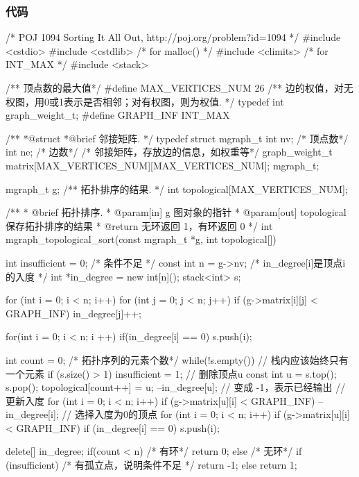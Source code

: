 \subsubsection{代码}
\begin{Codex}[label=poj_1094.c]
/* POJ 1094 Sorting It All Out, http://poj.org/problem?id=1094 */
#include <cstdio>
#include <cstdlib>  /* for malloc() */
#include <climits>  /* for INT_MAX */
#include <stack>

/** 顶点数的最大值*/
#define MAX_VERTICES_NUM 26
/** 边的权值，对无权图，用0或1表示是否相邻；对有权图，则为权值. */
typedef int graph_weight_t;
#define GRAPH_INF INT_MAX

/**
 *@struct
 *@brief 邻接矩阵.
 */
typedef struct mgraph_t {
    int nv; /* 顶点数*/
    int ne; /* 边数*/
    /* 邻接矩阵，存放边的信息，如权重等*/
    graph_weight_t matrix[MAX_VERTICES_NUM][MAX_VERTICES_NUM];
} mgraph_t;

mgraph_t g;
/** 拓扑排序的结果. */
int topological[MAX_VERTICES_NUM];

/**
  * @brief 拓扑排序.
  * @param[in] g 图对象的指针
  * @param[out] topological 保存拓扑排序的结果
  * @return 无环返回 1，有环返回 0
  */
int mgraph_topological_sort(const mgraph_t *g, int topological[]) {
    int insufficient = 0;  /* 条件不足 */
    const int n = g->nv;
    /* in_degree[i]是顶点i的入度 */
    int *in_degree = new int[n]();
    stack<int> s;

    for (int i = 0; i < n; i++) {
        for (int j = 0; j < n; j++) {
            if (g->matrix[i][j] < GRAPH_INF)
                in_degree[j]++;
        }
    }

    for(int i = 0; i < n; i ++) {
        if(in_degree[i] == 0) {
            s.push(i);
        }
    }

    int count = 0; /* 拓扑序列的元素个数*/
    while(!s.empty()) {
        // 栈内应该始终只有一个元素
        if (s.size() > 1) insufficient = 1;
        // 删除顶点u
        const int u = s.top(); s.pop();
        topological[count++] = u;
        --in_degree[u];  // 变成 -1，表示已经输出
        // 更新入度
        for (int i = 0; i < n; i++) if (g->matrix[u][i] < GRAPH_INF) {
            --in_degree[i];
        }
        // 选择入度为0的顶点
        for (int i = 0; i < n; i++) if (g->matrix[u][i] < GRAPH_INF) {
            if (in_degree[i] == 0) s.push(i);
        }
    }

    delete[] in_degree;
    if(count < n) { /* 有环*/
        return 0;
    } else { /* 无环*/
        if (insufficient) {  /* 有孤立点，说明条件不足 */
            return -1;
        } else {
            return 1;
        }
    }
}


\end{Codex}
